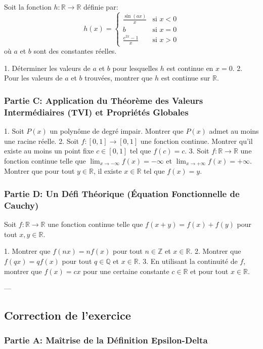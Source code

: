 \documentclass[12pt,a4paper]{report}
\begin{document}
Soit la fonction $h: \mathbb{R} \to \mathbb{R}$ définie par:
$$ h(x) = \begin{cases} \frac{\sin(ax)}{x} & \text{si } x < 0 \\ b & \text{si } x = 0 \\ \frac{e^{2x} - 1}{x} & \text{si } x > 0 \end{cases} $$
où $a$ et $b$ sont des constantes réelles.

1.  Déterminer les valeurs de $a$ et $b$ pour lesquelles $h$ est continue en $x=0$.
2.  Pour les valeurs de $a$ et $b$ trouvées, montrer que $h$ est continue sur $\mathbb{R}$.

\subsubsection{Partie C: Application du Théorème des Valeurs Intermédiaires (TVI) et Propriétés Globales}

1.  Soit $P(x)$ un polynôme de degré impair. Montrer que $P(x)$ admet au moins une racine réelle.
2.  Soit $f: [0, 1] \to [0, 1]$ une fonction continue. Montrer qu'il existe au moins un point fixe $c \in [0, 1]$ tel que $f(c) = c$.
3.  Soit $f: \mathbb{R} \to \mathbb{R}$ une fonction continue telle que $\lim_{x \to -\infty} f(x) = -\infty$ et $\lim_{x \to +\infty} f(x) = +\infty$. Montrer que pour tout $y \in \mathbb{R}$, il existe $x \in \mathbb{R}$ tel que $f(x) = y$.

\subsubsection{Partie D: Un Défi Théorique (Équation Fonctionnelle de Cauchy)}

Soit $f: \mathbb{R} \to \mathbb{R}$ une fonction continue telle que $f(x+y) = f(x) + f(y)$ pour tout $x, y \in \mathbb{R}$.

1.  Montrer que $f(nx) = nf(x)$ pour tout $n \in \mathbb{Z}$ et $x \in \mathbb{R}$.
2.  Montrer que $f(qx) = qf(x)$ pour tout $q \in \mathbb{Q}$ et $x \in \mathbb{R}$.
3.  En utilisant la continuité de $f$, montrer que $f(x) = cx$ pour une certaine constante $c \in \mathbb{R}$ et pour tout $x \in \mathbb{R}$.

---

\subsection{Correction de l'exercice}

\subsubsection{Partie A: Maîtrise de la Définition Epsilon-Delta}
\end{document}
